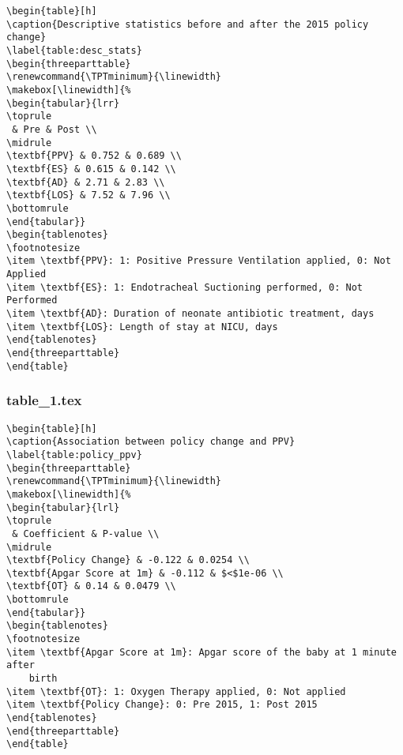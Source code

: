 \documentclass[11pt]{article}
\begin{document}
\begin{Verbatim}[tabsize=4]
\begin{table}[h]
\caption{Descriptive statistics before and after the 2015 policy change}
\label{table:desc_stats}
\begin{threeparttable}
\renewcommand{\TPTminimum}{\linewidth}
\makebox[\linewidth]{%
\begin{tabular}{lrr}
\toprule
 & Pre & Post \\
\midrule
\textbf{PPV} & 0.752 & 0.689 \\
\textbf{ES} & 0.615 & 0.142 \\
\textbf{AD} & 2.71 & 2.83 \\
\textbf{LOS} & 7.52 & 7.96 \\
\bottomrule
\end{tabular}}
\begin{tablenotes}
\footnotesize
\item \textbf{PPV}: 1: Positive Pressure Ventilation applied, 0: Not Applied
\item \textbf{ES}: 1: Endotracheal Suctioning performed, 0: Not Performed
\item \textbf{AD}: Duration of neonate antibiotic treatment, days
\item \textbf{LOS}: Length of stay at NICU, days
\end{tablenotes}
\end{threeparttable}
\end{table}

\end{Verbatim}

\subsubsection*{table\_1.tex}

\begin{Verbatim}[tabsize=4]
\begin{table}[h]
\caption{Association between policy change and PPV}
\label{table:policy_ppv}
\begin{threeparttable}
\renewcommand{\TPTminimum}{\linewidth}
\makebox[\linewidth]{%
\begin{tabular}{lrl}
\toprule
 & Coefficient & P-value \\
\midrule
\textbf{Policy Change} & -0.122 & 0.0254 \\
\textbf{Apgar Score at 1m} & -0.112 & $<$1e-06 \\
\textbf{OT} & 0.14 & 0.0479 \\
\bottomrule
\end{tabular}}
\begin{tablenotes}
\footnotesize
\item \textbf{Apgar Score at 1m}: Apgar score of the baby at 1 minute after
	birth
\item \textbf{OT}: 1: Oxygen Therapy applied, 0: Not applied
\item \textbf{Policy Change}: 0: Pre 2015, 1: Post 2015
\end{tablenotes}
\end{threeparttable}
\end{table}

\end{Verbatim}
\end{document}
